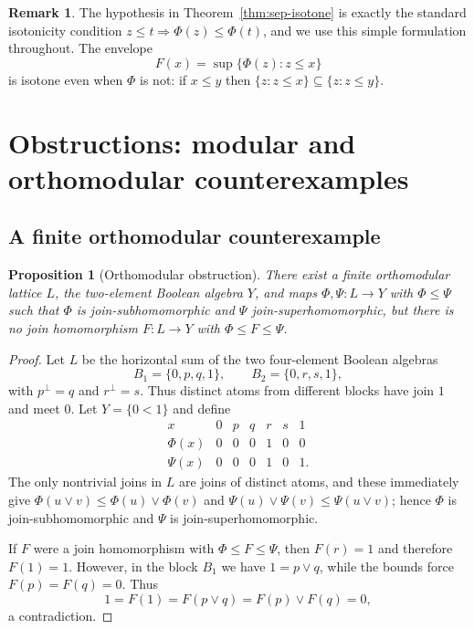 \documentclass[11pt]{amsart}
\newtheorem{proposition}[theorem]{Proposition}
\theoremstyle{definition}
\newtheorem{remark}[theorem]{Remark}
\newcommand{\join}{\vee}
\begin{document}
\begin{remark}\label{rem:isotone-simple}
The hypothesis in Theorem~\ref{thm:sep-isotone} is exactly the standard isotonicity condition
$z\le t\Rightarrow \Phi(z)\le\Phi(t)$, and we use this simple formulation throughout.
The envelope
\[
F(x)=\sup\{\Phi(z):z\le x\}
\]
is isotone even when $\Phi$ is not: if $x\le y$ then $\{z:z\le x\}\subseteq\{z:z\le y\}$.
\end{remark}

\section{Obstructions: modular and orthomodular counterexamples}

\subsection{A finite orthomodular counterexample}

\begin{proposition}[Orthomodular obstruction]\label{prop:OML-counterexample}
There exist a finite orthomodular lattice $L$, the two-element Boolean algebra $Y$, and maps $\Phi,\Psi\colon L\to Y$ with $\Phi\le\Psi$
such that $\Phi$ is join-subhomomorphic and $\Psi$ join-superhomomorphic, but there is no join homomorphism $F\colon L\to Y$ with $\Phi\le F\le\Psi$.
\end{proposition}

\begin{proof}
Let $L$ be the horizontal sum of the two four-element Boolean algebras
\[
B_1=\{0,p,q,1\},\qquad B_2=\{0,r,s,1\},
\]
with $p^\perp=q$ and $r^\perp=s$.
Thus distinct atoms from different blocks have join $1$ and meet $0$.
Let $Y=\{0<1\}$ and define
\[
\begin{array}{c|cccccc}
x&0&p&q&r&s&1\\ \hline
\Phi(x)&0&0&0&1&0&0\\
\Psi(x)&0&0&0&1&0&1.
\end{array}
\]
The only nontrivial joins in $L$ are joins of distinct atoms, and these immediately give
$\Phi(u\join v)\le\Phi(u)\join\Phi(v)$ and
$\Psi(u)\join\Psi(v)\le\Psi(u\join v)$; hence $\Phi$ is join-subhomomorphic and $\Psi$ is join-superhomomorphic.

If $F$ were a join homomorphism with $\Phi\le F\le\Psi$, then $F(r)=1$ and therefore $F(1)=1$.
However, in the block $B_1$ we have $1=p\join q$, while the bounds force $F(p)=F(q)=0$.
Thus
\[
1=F(1)=F(p\join q)=F(p)\join F(q)=0,
\]
a contradiction.
\end{proof}
\end{document}
